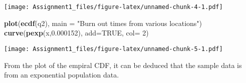 \documentclass[]{article}
\newenvironment{Shaded}{\begin{snugshade}}{\end{snugshade}}
\newcommand{\DataTypeTok}[1]{\textcolor[rgb]{0.13,0.29,0.53}{#1}}
\newcommand{\DecValTok}[1]{\textcolor[rgb]{0.00,0.00,0.81}{#1}}
\newcommand{\FloatTok}[1]{\textcolor[rgb]{0.00,0.00,0.81}{#1}}
\newcommand{\KeywordTok}[1]{\textcolor[rgb]{0.13,0.29,0.53}{\textbf{#1}}}
\newcommand{\NormalTok}[1]{#1}
\newcommand{\OtherTok}[1]{\textcolor[rgb]{0.56,0.35,0.01}{#1}}
\newcommand{\StringTok}[1]{\textcolor[rgb]{0.31,0.60,0.02}{#1}}
\begin{document}
\texttt{[image: Assignment1\_files/figure-latex/unnamed-chunk-4-1.pdf]}

\begin{Shaded}
\begin{Highlighting}[]
\KeywordTok{plot}\NormalTok{(}\KeywordTok{ecdf}\NormalTok{(q2), }\DataTypeTok{main =} \StringTok{"Burn out times from various locations"}\NormalTok{)}
\KeywordTok{curve}\NormalTok{(}\KeywordTok{pexp}\NormalTok{(x,}\FloatTok{0.000152}\NormalTok{), }\DataTypeTok{add=}\OtherTok{TRUE}\NormalTok{, }\DataTypeTok{col=} \DecValTok{2}\NormalTok{)}
\end{Highlighting}
\end{Shaded}

\texttt{[image: Assignment1\_files/figure-latex/unnamed-chunk-5-1.pdf]}

From the plot of the empiral CDF, it can be deduced that the sample data
is from an exponential population data.
\end{document}
